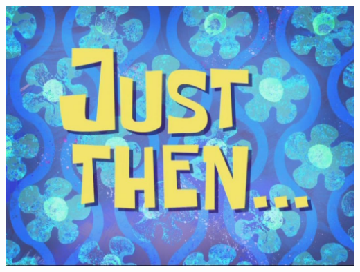 \documentclass[]{beamer}
\begin{document}
\begin{frame}
\centering
\includegraphics[width=\textwidth]{just_then}
\end{frame}
\end{document}
